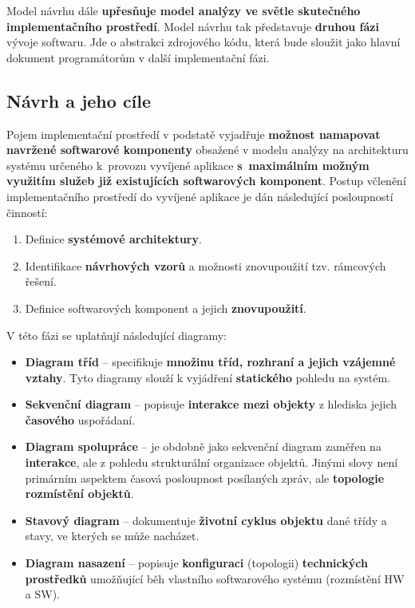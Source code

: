 Model návrhu dále \textbf{upřesňuje model analýzy ve světle skutečného implementačního prostředí}. Model návrhu tak představuje \textbf{druhou fázi} vývoje softwaru. Jde o abstrakci zdrojového kódu, která bude sloužit jako hlavní dokument programátorům v další implementační fázi.

\subsection{Návrh a jeho cíle}
Pojem implementační prostředí v podstatě vyjadřuje \textbf{možnost namapovat navržené softwarové komponenty} obsažené v modelu analýzy na architekturu systému určeného k provozu vyvíjené aplikace \textbf{s maximálním možným využitím služeb již existujících softwarových komponent}. Postup včlenění implementačního prostředí do vyvíjené aplikace je dán následující posloupností činností:
\begin{enumerate}
\item Definice \textbf{systémové architektury}.
\item Identifikace \textbf{návrhových vzorů} a možnosti znovupoužití tzv. rámcových řešení.
\item Definice softwarových komponent a jejich \textbf{znovupoužití}.
\end{enumerate}
V této fázi se uplatňují následující diagramy:

\begin{itemize}
\item \textbf{Diagram tříd} -- specifikuje \textbf{množinu tříd, rozhraní a jejich vzájemné vztahy}. Tyto diagramy slouží k vyjádření \textbf{statického} pohledu na systém.
\item \textbf{Sekvenční diagram} -- popisuje \textbf{interakce mezi objekty} z hlediska jejich \textbf{časového} uspořádaní.
\item \textbf{Diagram spolupráce} -- je obdobně jako sekvenční diagram zaměřen na \textbf{interakce}, ale {z pohledu strukturální organizace objektů}. Jinými slovy není primárním aspektem časová posloupnost posílaných zpráv, ale \textbf{topologie rozmístění objektů}.
\item \textbf{Stavový diagram} -- dokumentuje \textbf{životní cyklus objektu} dané třídy a stavy, ve kterých se může nacházet.
\item \textbf{Diagram nasazení} -- popisuje \textbf{konfiguraci} (topologii) \textbf{technických prostředků} umožňující běh vlastního softwarového systému (rozmístění HW a SW).
\end{itemize}

